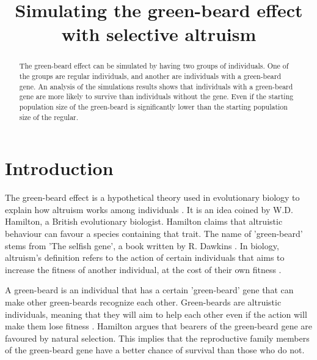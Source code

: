 \documentclass[conference]{IEEEtran}
\begin{document}
	
	\title{Simulating the green-beard effect with selective altruism}
	
	\author{
	}
	
	\maketitle
	
	\begin{abstract}
	The green-beard effect can be simulated by having two groups of individuals. One of the groups are regular individuals, and another are individuals with a green-beard gene. An analysis of the simulations results shows that individuals with a green-beard gene are more likely to survive than individuals without the gene. Even if the starting population size of the green-beard is significantly lower than the starting population size of the regular.
	\end{abstract}
	
	\section{Introduction}
	The green-beard effect is a hypothetical theory used in evolutionary biology to explain how altruism works among individuals \cite{hamilton1964genetical}. It is an idea coined by W.D. Hamilton, a British evolutionary biologist. Hamilton claims that altruistic behaviour can favour a species containing that trait. The name of 'green-beard' stems from 'The selfish gene', a book written by R. Dawkins \cite{dawkins2017selfish}. In biology, altruism's definition refers to the action of certain individuals that aims to increase the fitness of another individual, at the cost of their own fitness \cite{barrett2008natural}. 
	
	A green-beard is an individual that has a certain 'green-beard' gene that can make other green-beards recognize each other. Green-beards are altruistic individuals, meaning that they will aim to help each other even if the action will make them lose fitness \cite{gardner2010greenbeards}. Hamilton argues that bearers of the green-beard gene are favoured by natural selection. This implies that the reproductive family members of the green-beard gene have a better chance of survival than those who do not.
	
\end{document}
